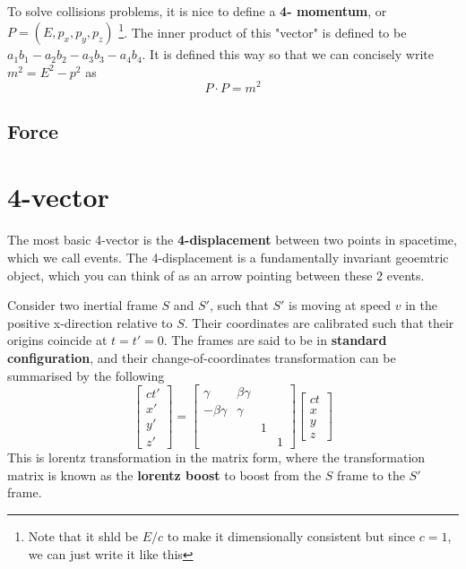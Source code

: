 To solve collisions problems, it is nice to define a \textbf{4- momentum}, or $P=(E,p_x,p_y,p_z)$ \footnote{Note that it shld be $E/c$ to make it dimensionally consistent but since $c=1$, we can just write it like this}. The inner product of this "vector" is defined to be $a_1b_1-a_2b_2-a_3b_3-a_4b_4$. It is defined this way so that we can concisely write $m^2=E^2-p^2$ as 
\begin{equation}
    P\cdot P=m^2
\end{equation}

\subsection{Force}






\section{4-vector}
The most basic 4-vector is the \textbf{4-displacement} between two points in spacetime, which we call events. The 4-displacement is a fundamentally invariant geoemtric object, which you can think of as an arrow pointing between these 2 events. 

Consider two inertial frame $S$ and $S'$, such that $S'$ is moving at speed $v$ in the positive x-direction relative to $S$. Their coordinates are calibrated such that their origins coincide at $t=t'=0$. The frames are said to be in \textbf{standard configuration}, and their change-of-coordinates transformation can be summarised by the following
\begin{equation}
    \begin{bmatrix}
        ct' \\
        x' \\ 
        y' \\ 
        z'
    \end{bmatrix}
    =
    \begin{bmatrix}
        \gamma & \beta \gamma &  & \\
        -\beta \gamma & \gamma &  & \\ 
         &  & 1 & \\ 
         &  &  & 1
    \end{bmatrix}
    \begin{bmatrix}
        ct\\
        x \\ 
        y \\ 
        z
    \end{bmatrix}
\end{equation}
This is lorentz transformation in the matrix form, where the transformation matrix is known as the \textbf{lorentz boost} to boost from the $S$ frame to the $S'$ frame.


